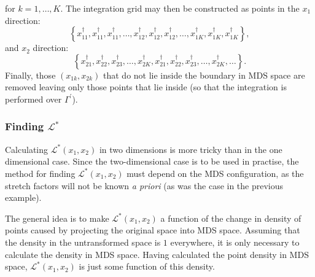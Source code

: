 for $k=1,\dots,K$. The integration grid may then be constructed as points in the $x_1$ direction:
\begin{equation*}
\left \{x^\dagger_{11},x^\dagger_{11},x^\dagger_{11},\dots, x^\dagger_{12}, x^\dagger_{12}, x^\dagger_{12},\dots, x^\dagger_{1K}, x^\dagger_{1K}, x^\dagger_{1K}\right \},
\end{equation*}
and $x_2$ direction:
\begin{equation*}
\left \{x^\dagger_{21},x^\dagger_{22}, x^\dagger_{23},\dots, x^\dagger_{2K},x^\dagger_{21},x^\dagger_{22}, x^\dagger_{23},\dots, x^\dagger_{2K},\dots\right \}.
\end{equation*}
Finally, those $(x_{1k},x_{2k})$ that do not lie inside the boundary in MDS space are removed leaving only those points that lie inside (so that the integration is performed over $\Gamma^\prime$).

\subsubsection{Finding $\mathcal{L}^*$}

Calculating $\mathcal{L}^*(x_1,x_2)$ in two dimensions is more tricky than in the one dimensional case. Since the two-dimensional case is to be used in practise, the method for finding $\mathcal{L}^*(x_1,x_2)$ must depend on the MDS configuration, as the stretch factors will not be known \emph{a priori} (as was the case in the previous example).

The general idea is to make $\mathcal{L}^*(x_1,x_2)$ a function of the change in density of points caused by projecting the original space into MDS space. Assuming that the density in the untransformed space is $1$ everywhere, it is only necessary to calculate the density in MDS space. Having calculated the point density in MDS space, $\mathcal{L}^*(x_1,x_2)$ is just some function of this density.

